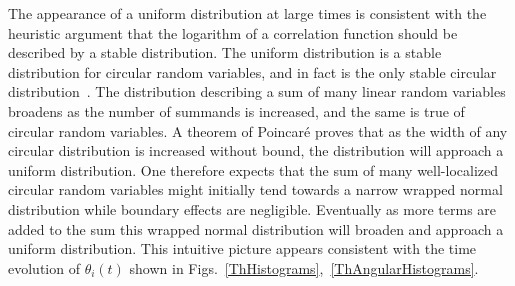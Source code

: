 The appearance of a uniform distribution at large times is consistent with the heuristic argument that the logarithm of a 
correlation function should be described by a stable distribution. The uniform distribution is a stable distribution for 
circular random variables, and in fact is the only stable circular distribution~\cite{Mardia:2009}. The distribution describing 
a sum of many linear random variables broadens as the number of summands is increased, and the same is true of circular 
random variables. A theorem of Poincar{\'e} proves that as the width of any circular distribution is increased without bound, 
the distribution will approach a uniform distribution. One therefore expects that the sum of many well-localized 
circular random variables might initially tend towards a narrow wrapped normal distribution while boundary effects are negligible. 
Eventually as more terms are added to the sum this wrapped normal distribution will broaden and approach a uniform distribution. 
This intuitive picture appears consistent with the time evolution of $\theta_i(t)$  shown in 
Figs.~\ref{ThHistograms},~\ref{ThAngularHistograms}.


